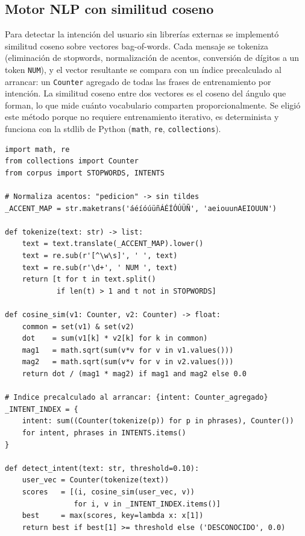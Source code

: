 \documentclass[12pt,a4paper]{article}
\begin{document}
\subsection{Motor NLP con similitud coseno}

Para detectar la intención del usuario sin librerías externas se implementó
similitud coseno sobre vectores bag-of-words. Cada mensaje se tokeniza
(eliminación de stopwords, normalización de acentos, conversión de dígitos a
un token \texttt{NUM}), y el vector resultante se compara con un índice
precalculado al arrancar: un \texttt{Counter} agregado de todas las frases
de entrenamiento por intención. La similitud coseno entre dos vectores es
el coseno del ángulo que forman, lo que mide cuánto vocabulario comparten
proporcionalmente. Se eligió este método porque no requiere entrenamiento
iterativo, es determinista y funciona con la stdlib de Python (\texttt{math},
\texttt{re}, \texttt{collections}).

\begin{lstlisting}[style=python, caption={nlp.py --- similitud coseno con bag-of-words}]
import math, re
from collections import Counter
from corpus import STOPWORDS, INTENTS

# Normaliza acentos: "pedicion" -> sin tildes
_ACCENT_MAP = str.maketrans('áéíóúüñÁÉÍÓÚÜÑ', 'aeiouunAEIOUUN')

def tokenize(text: str) -> list:
    text = text.translate(_ACCENT_MAP).lower()
    text = re.sub(r'[^\w\s]', ' ', text)
    text = re.sub(r'\d+', ' NUM ', text)
    return [t for t in text.split()
            if len(t) > 1 and t not in STOPWORDS]

def cosine_sim(v1: Counter, v2: Counter) -> float:
    common = set(v1) & set(v2)
    dot    = sum(v1[k] * v2[k] for k in common)
    mag1   = math.sqrt(sum(v*v for v in v1.values()))
    mag2   = math.sqrt(sum(v*v for v in v2.values()))
    return dot / (mag1 * mag2) if mag1 and mag2 else 0.0

# Indice precalculado al arrancar: {intent: Counter_agregado}
_INTENT_INDEX = {
    intent: sum((Counter(tokenize(p)) for p in phrases), Counter())
    for intent, phrases in INTENTS.items()
}

def detect_intent(text: str, threshold=0.10):
    user_vec = Counter(tokenize(text))
    scores   = [(i, cosine_sim(user_vec, v))
                for i, v in _INTENT_INDEX.items()]
    best     = max(scores, key=lambda x: x[1])
    return best if best[1] >= threshold else ('DESCONOCIDO', 0.0)
\end{lstlisting}
\end{document}
